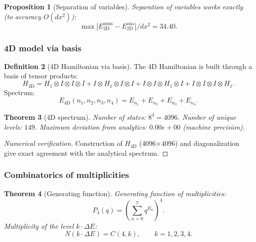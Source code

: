 \documentclass[11pt,a4paper]{article}
\newtheorem{theorem}{Theorem}[section]
\newtheorem{proposition}[theorem]{Proposition}
\theoremstyle{definition}
\newtheorem{definition}[theorem]{Definition}
\begin{document}
\begin{proposition}[Separation of variables]
\label{prop:membrane-2D-separation}
Separation of variables works \emph{exactly} (to accuracy $O(dx^2)$):
\begin{equation}
    \max\left|E_{\text{2D}}^{\text{num}} - E_{\text{2D}}^{\text{ana}}\right| / dx^2 = 34.40.
    \label{eq:membrane-2D-ratio}
\end{equation}
\end{proposition}

\subsubsection{4D model via basis}

\begin{definition}[4D Hamiltonian via basis]
\label{def:membrane-4D}
The 4D Hamiltonian is built through a basis of tensor products:
\begin{equation}
    H_{\text{4D}} = H_1 \otimes I \otimes I \otimes I
    + I \otimes H_1 \otimes I \otimes I
    + I \otimes I \otimes H_1 \otimes I
    + I \otimes I \otimes I \otimes H_1.
    \label{eq:membrane-H4D}
\end{equation}
Spectrum:
\begin{equation}
    E_{\text{4D}}(n_1, n_2, n_3, n_4) = E_{n_1} + E_{n_2} + E_{n_3} + E_{n_4}.
    \label{eq:membrane-spectrum-4D}
\end{equation}
\end{definition}

\begin{theorem}[4D spectrum]
\label{thm:membrane-4D-spectrum}
Number of states: $8^4 = 4096$.
Number of unique levels: $149$.
Maximum deviation from analytics: $0.00e+00$ (machine precision).
\end{theorem}

\begin{proof}[Numerical verification]
Construction of $H_{\text{4D}}$ (4096$\times$4096) and diagonalization give
exact agreement with the analytical spectrum.
\end{proof}

\subsubsection{Combinatorics of multiplicities}

\begin{theorem}[Generating function]
\label{thm:membrane-generating}
Generating function of multiplicities:
\begin{equation}
    P_4(q) = \left(\sum_{n=0}^{7} q^{E_n}\right)^4.
    \label{eq:membrane-generating}
\end{equation}
Multiplicity of the level $k \cdot \Delta E$:
\begin{equation}
    \boxed{
    N(k \cdot \Delta E) = C(4, k), \qquad k = 1, 2, 3, 4.
    }
    \label{eq:membrane-multiplicity}
\end{equation}
\end{theorem}
\end{document}
